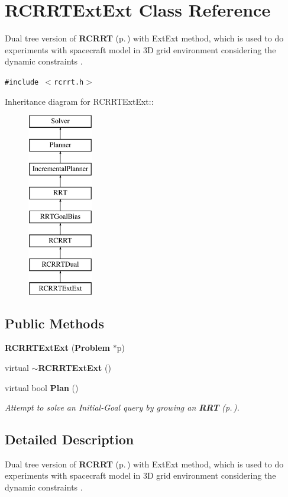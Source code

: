 \section{RCRRTExt\-Ext  Class Reference}
\label{classRCRRTExtExt}
Dual tree version of {\bf RCRRT} {\rm (p.\,\pageref{classRCRRT})} with Ext\-Ext method, which is used to do experiments with spacecraft model in 3D grid environment considering the dynamic constraints . 


{\tt \#include $<$rcrrt.h$>$}

Inheritance diagram for RCRRTExt\-Ext::\begin{figure}[H]
\begin{center}
\leavevmode
\includegraphics[height=8cm]{classRCRRTExtExt}
\end{center}
\end{figure}
\subsection*{Public Methods}
\begin{CompactItemize}
\item 
{\bf RCRRTExt\-Ext} ({\bf Problem} $\ast$p)
\item 
virtual {\bf $\sim$RCRRTExt\-Ext} ()
\item 
virtual bool {\bf Plan} ()
\begin{CompactList}\small\item\em Attempt to solve an Initial-Goal query by growing an {\bf RRT} {\rm (p.\,\pageref{classRRT})}.\item\end{CompactList}\end{CompactItemize}


\subsection{Detailed Description}
Dual tree version of {\bf RCRRT} {\rm (p.\,\pageref{classRCRRT})} with Ext\-Ext method, which is used to do experiments with spacecraft model in 3D grid environment considering the dynamic constraints .



